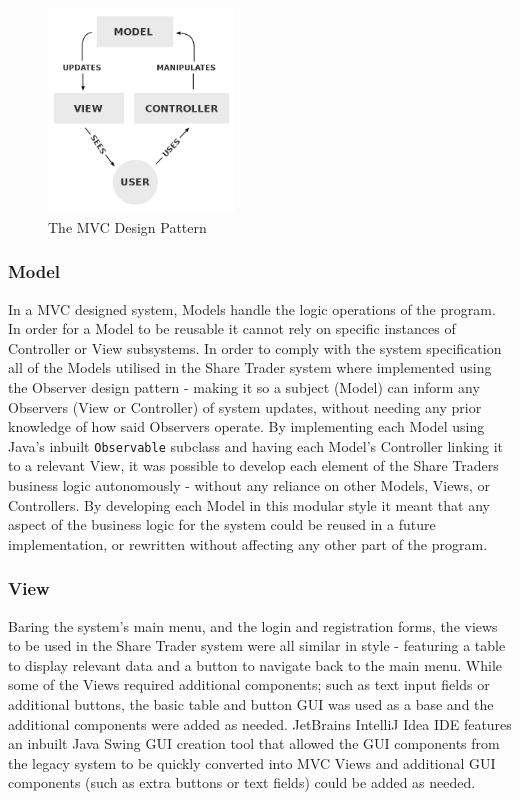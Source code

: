 \documentclass[12pt, a4paper,titlepage]{article}
\begin{document}
\begin{figure}[]
    \begin{center}
        \includegraphics[width = 0.44\textwidth]{./res/mvc.png}
        \caption[The MVC Design Pattern]{The MVC Design Pattern 
        \footnotemark} 
        \label{fig_mvc}
    \end{center}
\end{figure}

\subsubsection{Model}
In a MVC designed system, Models handle the logic operations of the program.
In order for a Model to be reusable it cannot rely on specific instances of
Controller or View subsystems. 
In order to comply with the system specification all of the Models utilised in
the Share Trader system where implemented using the Observer design pattern -
making it so a subject (Model) can inform any Observers (View or Controller)
of system updates, without needing any prior knowledge of how said Observers
operate.  
By implementing each Model using Java’s inbuilt {\tt Observable} subclass and
having each Model’s Controller linking it to a relevant View, it was possible
to develop each element of the Share Traders business logic autonomously -
without any reliance on other Models, Views, or Controllers.
By developing each Model in this modular style it meant that any aspect of the
business logic for the system could be reused in a future implementation, or
rewritten without affecting any other part of the program.

\subsubsection{View}
Baring the system's main menu, and the login and registration forms, the views
to be used in the Share Trader system were all similar in style - featuring a
table to display relevant data and a button to navigate back to the main menu.
While some of the Views required additional components; such as text input
fields or additional buttons, the basic table and button GUI was used as a
base and the additional components were added as needed.  
JetBrains IntelliJ Idea IDE features an inbuilt Java Swing GUI creation tool
that allowed the GUI components from the legacy system to be quickly converted
into MVC Views and additional GUI components (such as extra buttons or text
fields) could be added as needed.
\end{document}
